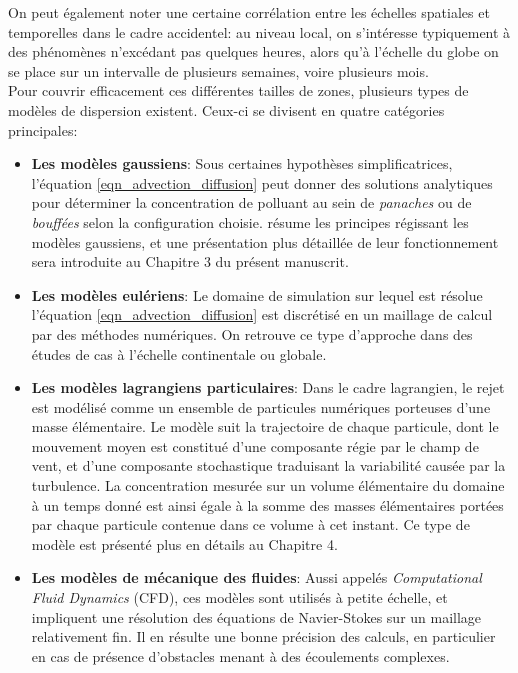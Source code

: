 	On peut également noter une certaine corrélation entre les échelles spatiales et temporelles dans le cadre accidentel: au niveau local, on s'intéresse typiquement à des phénomènes n'excédant pas quelques heures, alors qu'à l'échelle du globe on se place sur un intervalle de plusieurs semaines, voire plusieurs mois.\\ 
	
	Pour couvrir efficacement ces différentes tailles de zones, plusieurs types de modèles de dispersion existent. Ceux-ci se divisent en quatre catégories principales:\\
	
	\begin{itemize} 
		
	\item \textbf{Les modèles gaussiens}:
	Sous certaines hypothèses simplificatrices, l'équation \eqref{eqn_advection_diffusion} peut donner des solutions analytiques pour déterminer la concentration de polluant au sein de \textit{panaches} ou de \textit{bouffées} selon la configuration choisie. \cite{Stockie2011} résume les principes régissant les modèles gaussiens, et une présentation plus détaillée de leur fonctionnement sera introduite au Chapitre 3 du présent manuscrit.\\
	
	\item \textbf{Les modèles eulériens}:
	Le domaine de simulation sur lequel est résolue l'équation \eqref{eqn_advection_diffusion} est discrétisé en un maillage de calcul  par des méthodes numériques. On retrouve ce type d'approche dans des études de cas à l'échelle continentale \cite{Saunier2013} ou globale. \\
	
	\item \textbf{Les modèles lagrangiens particulaires}:
	Dans le cadre lagrangien, le rejet est modélisé comme un ensemble de particules numériques porteuses d'une masse élémentaire. Le modèle suit la trajectoire de chaque particule, dont le mouvement moyen est constitué d'une composante régie par le champ de vent, et d'une composante stochastique traduisant la variabilité causée par la turbulence. La concentration mesurée sur un volume élémentaire du domaine à un temps donné est ainsi égale à la somme des masses élémentaires portées par chaque particule contenue dans ce volume à cet instant. Ce type de modèle est présenté plus en détails au Chapitre 4.\\
	
	\item \textbf{Les modèles de mécanique des fluides}:
	Aussi appelés \textit{Computational Fluid Dynamics} (CFD), ces modèles sont utilisés à petite échelle, et impliquent une résolution des équations de Navier-Stokes sur un maillage relativement fin. Il en résulte une bonne précision des calculs, en particulier en cas de présence d'obstacles menant à des écoulements complexes.\\
	
	\end{itemize}
	
